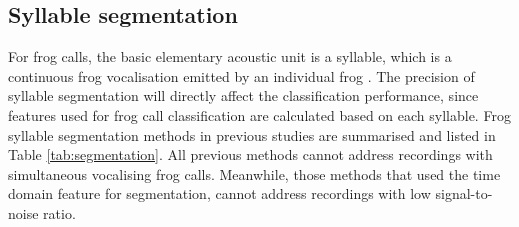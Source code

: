 \subsection{Syllable segmentation}
For frog calls, the basic elementary acoustic unit is a syllable, which is a continuous frog vocalisation emitted by an individual frog \citep{huang2009frog}. The precision of syllable segmentation will directly affect the classification performance, since features used for frog call classification are calculated based on each syllable. Frog syllable segmentation methods in previous studies are summarised and listed in Table \ref{tab:segmentation}. All previous methods cannot address recordings with simultaneous vocalising frog calls. Meanwhile, those methods that used the time domain feature for segmentation, cannot address recordings with low signal-to-noise ratio. 


  
\begin{table}[htb!]
\centering
\caption[Summary of related work]{Summary of related work for frog syllable segmentation. Here, E denotes energy, ZCR denotes zero-crossing rate.
Sequential means that syllables are segmented using the same sequence in the recordings.}
\label{tab:segmentation}
\end{table}




